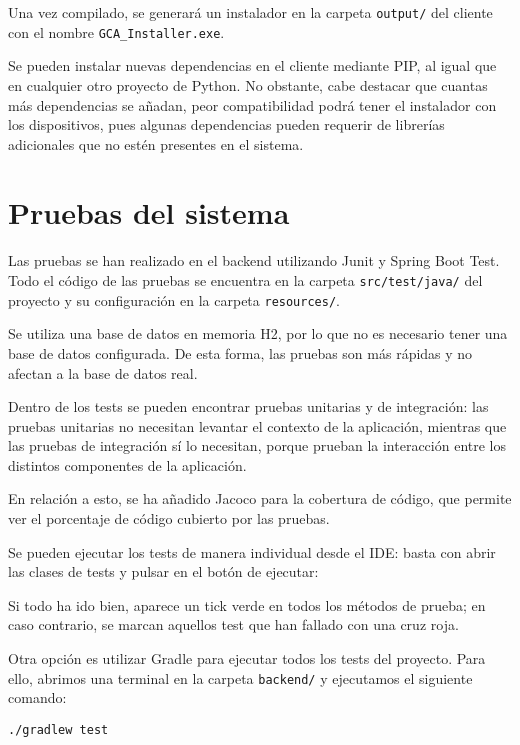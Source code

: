 Una vez compilado, se generará un instalador en la carpeta \texttt{output/} del cliente con el nombre \texttt{GCA\_Installer.exe}.

Se pueden instalar nuevas dependencias en el cliente mediante PIP, al igual que en cualquier otro proyecto de Python.
No obstante, cabe destacar que cuantas más dependencias se añadan, peor compatibilidad podrá tener el instalador con
los dispositivos, pues algunas dependencias pueden requerir de librerías adicionales que no estén presentes en
el sistema.

\section{Pruebas del sistema}

Las pruebas se han realizado en el backend utilizando Junit y Spring Boot Test.
Todo el código de las pruebas se encuentra en la carpeta \texttt{src/test/java/} del proyecto y su configuración en
la carpeta \texttt{resources/}.

Se utiliza una base de datos en memoria H2, por lo que no es necesario tener una base de datos
configurada.
De esta forma, las pruebas son más rápidas y no afectan a la base de datos real.

Dentro de los tests se pueden encontrar pruebas unitarias y de integración: las pruebas unitarias no necesitan levantar
el contexto de la aplicación, mientras que las pruebas de integración sí lo necesitan, porque prueban la interacción entre
los distintos componentes de la aplicación.

En relación a esto, se ha añadido Jacoco para la cobertura de código, que permite ver el porcentaje de código cubierto
por las pruebas.

Se pueden ejecutar los tests de manera individual desde el IDE: basta con abrir las clases de tests y pulsar en el botón
de ejecutar:


Si todo ha ido bien, aparece un tick verde en todos los métodos de prueba; en caso contrario, se marcan aquellos
test que han fallado con una cruz roja.

Otra opción es utilizar Gradle para ejecutar todos los tests del proyecto.
Para ello, abrimos una terminal en la carpeta \texttt{backend/} y ejecutamos el siguiente comando:
\begin{verbatim}
./gradlew test
\end{verbatim}

